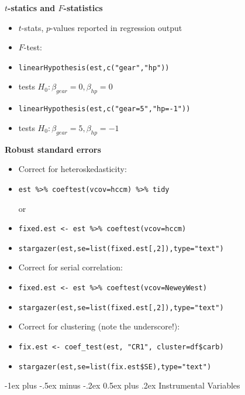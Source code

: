 \documentclass[10pt,landscape]{article}
\makeatletter
\renewcommand{\section}{\@startsection{section}{1}{0mm}%
                                {-1ex plus -.5ex minus -.2ex}%
                                {0.5ex plus .2ex}%
                                {\normalfont\large\bfseries}}
\makeatother
\begin{document}
\begin{multicols}{3}
\smallskip{}

\textbf{$t$-statics and $F$-statistics}\\
\begin{itemize}
    \item $t$-stats, $p$-values reported in regression output
    \item $F$-test:
    \item[] \verb!linearHypothesis(est,c("gear","hp"))!
    \item[] tests $H_0: \beta_{gear} = 0, \beta_{hp}=0$
    \item[] \verb!linearHypothesis(est,c("gear=5","hp=-1"))!
    \item[] tests $H_0: \beta_{gear} = 5, \beta_{hp}=-1$
\end{itemize}

\smallskip{}

\textbf{Robust standard errors}\\
\begin{itemize}
    \item Correct for heteroskedasticity:
    \item[] \verb!est %>% coeftest(vcov=hccm) %>% tidy!
    
    or
    
    \item[] \verb!fixed.est <- est %>% coeftest(vcov=hccm)!
    \item[] \verb!stargazer(est,se=list(fixed.est[,2]),type="text")!
    \item Correct for serial correlation:
    \item[] \verb!fixed.est <- est %>% coeftest(vcov=NeweyWest)!
    \item[] \verb!stargazer(est,se=list(fixed.est[,2]),type="text")!
    \item Correct for clustering (note the underscore!):
    \item[] \verb!fix.est <- coef_test(est, "CR1", cluster=df$carb)!
    \item[] \verb!stargazer(est,se=list(fix.est$SE),type="text")!
\end{itemize}




\section{Instrumental Variables}

\smallskip{}


\end{multicols}
\end{document}
